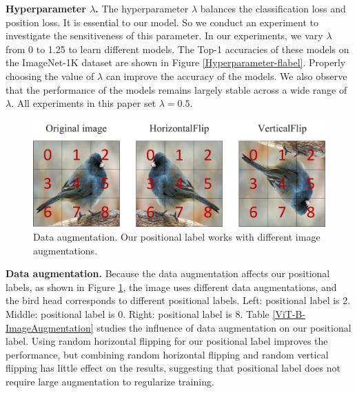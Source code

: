 \documentclass{article}
\begin{document}
\noindent \textbf{Hyperparameter $\lambda$.} The hyperparameter $\lambda$ balances the classification loss and position loss. It is essential to our model. So we conduct an experiment to investigate the sensitiveness of this parameter. In our experiments, we vary $\lambda $ from 0 to 1.25 to learn different models. The Top-1 accuracies of these models on the ImageNet-1K dataset are shown in Figure \ref{Hyperparameter-flabel}. Properly choosing the value of $\lambda $ can improve the accuracy of the models. We also observe that the performance of the models remains largely stable across a wide range of $\lambda $. All experiments in this paper set $\lambda =0.5$.



\begin{figure}[h]
  \centering
   \includegraphics[width=1.0\linewidth]{ImageAugmentation.pdf}
   \caption{Data augmentation. Our positional label works with different image augmentations.}
   \label{ImageAugmentation-flabel}
\end{figure}

\noindent \textbf{Data augmentation.} Because the data augmentation affects our positional labels, as shown in Figure \ref{ImageAugmentation-flabel}, the image uses different data augmentations, and the bird head corresponds to different positional labels. Left: positional label is 2. Middle: positional label is 0. Right: positional label is 8. Table \ref{ViT-B-ImageAugmentation} studies the inﬂuence of data augmentation on our positional label. Using random horizontal ﬂipping for our positional label improves the performance, but combining random horizontal ﬂipping and random vertical ﬂipping has little effect on the results, suggesting that positional label does not require large augmentation to regularize training.
\end{document}
